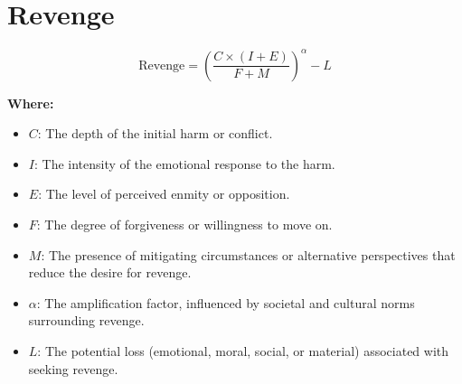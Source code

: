 \chapter{Revenge}

\begin{equation}
\text{Revenge} = \left( \frac{C \times (I + E)}{F + M} \right)^\alpha - L
\end{equation}

\textbf{Where:}

\begin{itemize}
    \item $C$: The depth of the initial harm or conflict.
    \item $I$: The intensity of the emotional response to the harm.
    \item $E$: The level of perceived enmity or opposition.
    \item $F$: The degree of forgiveness or willingness to move on.
    \item $M$: The presence of mitigating circumstances or alternative perspectives that reduce the desire for revenge.
    \item $\alpha$: The amplification factor, influenced by societal and cultural norms surrounding revenge.
    \item $L$: The potential loss (emotional, moral, social, or material) associated with seeking revenge.
\end{itemize}